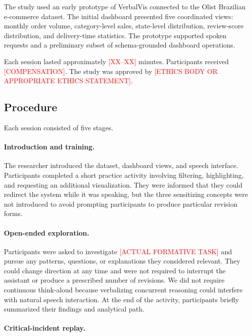 \documentclass[journal]{IEEEtran}
\begin{document}
The study used an early prototype of VerbalVis connected to the Olist Brazilian
e-commerce dataset. The initial dashboard presented five coordinated views:
monthly order volume, category-level sales, state-level distribution,
review-score distribution, and delivery-time statistics. The prototype
supported spoken requests and a preliminary subset of schema-grounded
dashboard operations.

Each session lasted approximately
\textcolor{red}{[XX--XX]} minutes. Participants received
\textcolor{red}{[COMPENSATION]}. The study was approved by
\textcolor{red}{[ETHICS BODY OR APPROPRIATE ETHICS STATEMENT]}.

\subsection{Procedure}
\label{sec:formative-procedure}

Each session consisted of five stages.

\paragraph{Introduction and training.}

The researcher introduced the dataset, dashboard views, and speech interface.
Participants completed a short practice activity involving filtering,
highlighting, and requesting an additional visualization. They were informed
that they could redirect the system while it was speaking, but the three
sensitizing concepts were not introduced to avoid prompting participants to
produce particular revision forms.

\paragraph{Open-ended exploration.}

Participants were asked to investigate
\textcolor{red}{[ACTUAL FORMATIVE TASK]} and pursue any patterns, questions,
or explanations they considered relevant. They could change direction at any
time and were not required to interrupt the assistant or produce a prescribed
number of revisions. We did not require continuous think-aloud because
verbalizing concurrent reasoning could interfere with natural speech
interaction. At the end of the activity, participants briefly summarized
their findings and analytical path.

\paragraph{Critical-incident replay.}
\end{document}
